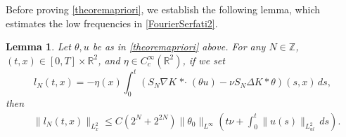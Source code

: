 \documentclass[11pt,reqno,xcolor=svgnames]{amsart}
\def\R{{\mathbb R}}
\def\Z{{\mathbb Z}}
\theoremstyle{plain}
\newtheorem{lemma}[theorem]{Lemma}
\theoremstyle{definition}
\theoremstyle{plain}
\theoremstyle{remark}
\newcommand{\stardot}{{\mathop{* \cdot}}}
\begin{document}
Before proving \cref{theoremapriori}, we establish the following lemma, which estimates the low frequencies in \cref{FourierSerfati2}.
\begin{lemma}\label{lowfreqwithN}
Let $\theta,u$ be as in \cref{theoremapriori} above.  For any $N\in\Z$, $(t,x)\in [0,T]\times\R^2$, and $\eta\in C^{\infty}_c(\R^2)$, if we set 
\begin{equation*}
l_N(t,x) = -\eta(x)\int_0^t \left( S_{N}\nabla K \stardot (\theta u)  - \nu S_{N}\Delta K \ast \theta\right)(s,x) \, ds,
\end{equation*}
then 
\begin{equation*} 
\begin{split}
&\| l_N(t,x) \|_{L^2_x} \leq C(2^{N}+ 2^{2N})\| \theta_0 \|_{L^{\infty}}\left(t\nu + \int_0^t \| u(s) \|_{L^2_{ul}}\, ds \right).
\end{split}
\end{equation*}
\end{lemma}
\end{document}
